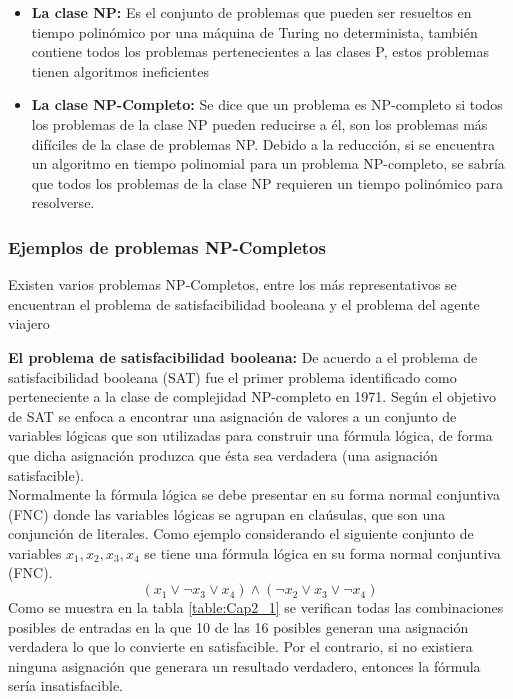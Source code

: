 \begin{enumerate}
\begin{itemize}
\item \textbf{La clase NP: }Es el conjunto de problemas que pueden ser resueltos en tiempo polinómico por una máquina de Turing no determinista, también contiene todos los problemas pertenecientes a las clases P, estos problemas tienen algoritmos ineficientes
\item \textbf{La clase NP-Completo: } Se dice que un problema es NP-completo si todos los problemas de la clase NP pueden reducirse a él, son los problemas más difíciles de la clase de problemas NP. Debido a la reducción, si se encuentra un algoritmo en tiempo polinomial para un problema NP-completo, se sabría que todos los problemas de la clase NP requieren un tiempo polinómico para resolverse.

\end{itemize}
\end{enumerate}

\subsubsection{Ejemplos de problemas NP-Completos}
Existen varios problemas NP-Completos, entre los más representativos se encuentran el problema de satisfacibilidad booleana y el problema del agente viajero 

\hspace*{1cm}\textbf{El problema de satisfacibilidad booleana:} De acuerdo a \cite{[Wilf]} el problema de satisfacibilidad booleana (SAT) fue el primer problema identificado como perteneciente a la clase de complejidad NP-completo en 1971. Según \cite{[Wilf]} el objetivo de SAT se enfoca a encontrar una asignación de valores a un conjunto de variables lógicas que son utilizadas para construir una fórmula lógica, de forma que dicha asignación produzca que ésta sea verdadera (una asignación satisfacible).\\
\hspace*{1cm}Normalmente la fórmula lógica se debe presentar en su forma normal conjuntiva (FNC) donde las variables lógicas se agrupan en claúsulas, que son una conjunción de literales. Como ejemplo considerando el siguiente conjunto de variables $x_1, x_2, x_3, x_4$ se tiene una fórmula lógica en su forma normal conjuntiva (FNC).
  $$(x_1 \lor \neg x_3 \lor x_4) \land (\neg x_2 \lor x_3 \lor \neg x_4)$$
\hspace*{1cm}Como se muestra en la tabla \ref{table:Cap2_1}  se verifican todas las combinaciones posibles de entradas en la que 10 de las 16 posibles generan una asignación verdadera lo que lo convierte en satisfacible. Por el contrario, si no existiera ninguna asignación que generara un resultado verdadero, entonces la fórmula sería insatisfacible.\\  

